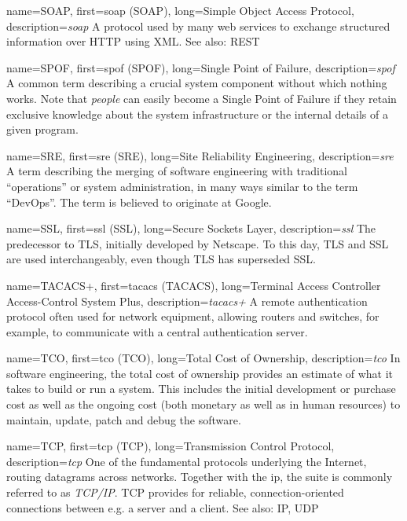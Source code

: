 {
	name={SOAP},
	first={\acrlong{soap} (SOAP)},
	long={Simple Object Access Protocol},
	description={{\em \acrlong{soap}} A protocol used by many
web services to exchange structured information over HTTP using XML.  See
also: REST}
}

{
	name={SPOF},
	first={\acrlong{spof} (SPOF)},
	long={Single Point of Failure},
	description={{\em \acrlong{spof}} A common term describing a
crucial system component without which nothing works.  Note that
{\em people} can easily become a Single Point of Failure if they retain
exclusive knowledge about the system infrastructure or the internal
details of a given program.}
}

{
	name={SRE},
	first={\acrlong{sre} (SRE)},
	long={Site Reliability Engineering},
	description={{\em \acrlong{sre}} A term
describing the merging of software engineering with
traditional ``operations'' or system administration,
in many ways similar to the term ``DevOps''.  The term
is believed to originate at Google.
	}
}

{
	name={SSL},
	first={\acrlong{ssl} (SSL)},
	long={Secure Sockets Layer},
	description={{\em \acrlong{ssl}} The predecessor to TLS, initially
developed by Netscape.  To this day, TLS and SSL are used interchangeably,
even though TLS has superseded SSL.}
}

{
	name={TACACS+},
	first={\acrlong{tacacs} (TACACS)},
	long={Terminal Access Controller Access-Control System Plus},
	description={{\em \acrlong{tacacs+}} A remote authentication protocol often used for network equipment,
allowing routers and switches, for example, to communicate with a central
authentication server.}
}

{
	name={TCO},
	first={\acrlong{tco} (TCO)},
	long={Total Cost of Ownership},
	description={{\em \acrlong{tco}} In software engineering, the total
cost of ownership provides an estimate of what it takes to build or run a
system.  This includes the initial development or purchase cost as well as
the ongoing cost (both monetary as well as in human resources) to
maintain, update, patch and debug the software.}
}

{
	name={TCP},
	first={\acrlong{tcp} (TCP)},
	long={Transmission Control Protocol},
	description={{\em \acrlong{tcp}} One of the fundamental protocols underlying the
Internet, routing datagrams across networks.  Together
with the \acrlong{ip}, the suite is commonly referred
to as {\em TCP/IP}.  TCP provides for reliable,
connection-oriented connections between e.g. a server
and a client.  See also: IP, UDP}
}

